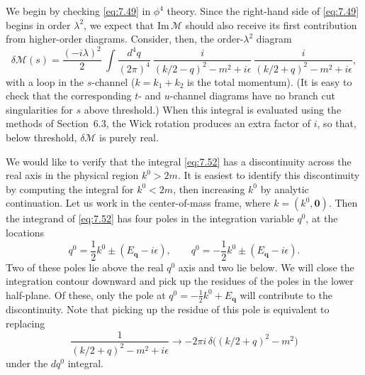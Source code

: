 We begin by checking \eqref{eq:7.49} in $\phi^4$ theory.  Since the
right-hand side of \eqref{eq:7.49} begins in order $\lambda^2$, we expect that
$\mathrm{Im}\,\mathcal{M}$ should also receive its first contribution from
higher-order diagrams.  Consider, then, the order-$\lambda^2$ diagram
\begin{equation}
  \delta\mathcal{M}(s) = \frac{(-i\lambda)^2}{2}\ \int
    \frac{d^4q}{(2\pi)^4}\ \frac{i}{(k/2-q)^2-m^2+i\epsilon}\
    \frac{i}{(k/2+q)^2-m^2+i\epsilon} ,
  \label{eq:7.52}
\end{equation}
with a loop in the $s$-channel ($k = k_1+k_2$ is the total momentum).  (It is
easy to check that the corresponding $t$- and $u$-channel diagrams have no
branch cut singularities for $s$ above threshold.)  When this integral is
evaluated using the methods of Section~6.3, the Wick rotation produces an
extra factor of $i$, so that, below threshold, $\delta\mathcal{M}$ is purely
real.

We would like to verify that the integral \eqref{eq:7.52} has a discontinuity
across the real axis in the physical region $k^0 > 2m$.  It is easiest to
identify this discontinuity by computing the integral for $k^0 < 2m$, then
increasing $k^0$ by analytic continuation.  Let us work in the center-of-mass
frame, where $k = (k^0, \mathbf{0})$.  Then the integrand of \eqref{eq:7.52}
has four poles in the integration variable $q^0$, at the locations
\begin{equation}
  q^0 = \frac{1}{2}k^0 \pm (E_{\mathbf{q}} - i\epsilon),
  \qquad
  q^0 = -\frac{1}{2}k^0 \pm (E_{\mathbf{q}} - i\epsilon) .
\end{equation}
Two of these poles lie above the real $q^0$ axis and two lie below.  We will
close the integration contour downward and pick up the residues of the poles
in the lower half-plane.  Of these, only the pole at
$q^0 = -\tfrac{1}{2}k^0 + E_{\mathbf{q}}$ will contribute to the
discontinuity.  Note that picking up the residue of this pole is equivalent
to replacing
\begin{equation}
  \frac{1}{(k/2+q)^2-m^2+i\epsilon}
    \to -2\pi i\,\delta\bigl( (k/2+q)^2 - m^2 \bigr)
  \label{eq:7.53}
\end{equation}
under the $dq^0$ integral.

